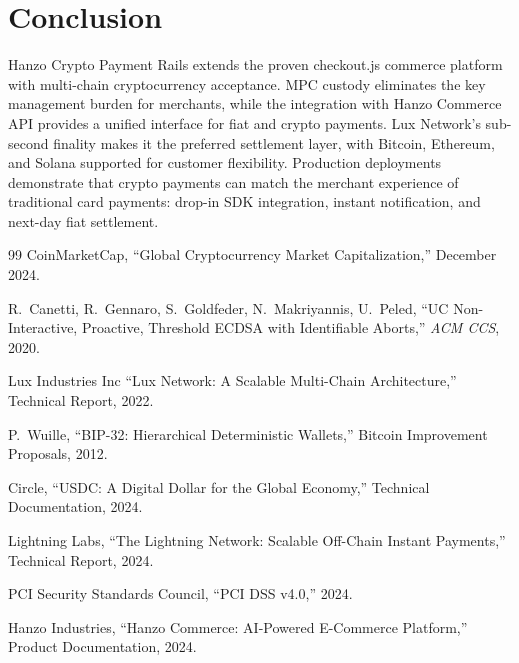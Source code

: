 \section{Conclusion}

\label{sec:conclusion}

Hanzo Crypto Payment Rails extends the proven checkout.js commerce
platform with multi-chain cryptocurrency acceptance. MPC custody
eliminates the key management burden for merchants, while the
integration with Hanzo Commerce API provides a unified interface for
fiat and crypto payments. Lux Network's sub-second finality makes it
the preferred settlement layer, with Bitcoin, Ethereum, and Solana
supported for customer flexibility. Production deployments demonstrate
that crypto payments can match the merchant experience of traditional
card payments: drop-in SDK integration, instant notification, and
next-day fiat settlement.

\begin{thebibliography}{99}
CoinMarketCap, ``Global Cryptocurrency Market Capitalization,''
December 2024.

R.~Canetti, R.~Gennaro, S.~Goldfeder, N.~Makriyannis, U.~Peled,
``UC Non-Interactive, Proactive, Threshold ECDSA with Identifiable
Aborts,'' \textit{ACM CCS}, 2020.

Lux Industries Inc ``Lux Network: A Scalable Multi-Chain Architecture,''
Technical Report, 2022.

P.~Wuille, ``BIP-32: Hierarchical Deterministic Wallets,''
Bitcoin Improvement Proposals, 2012.

Circle, ``USDC: A Digital Dollar for the Global Economy,''
Technical Documentation, 2024.

Lightning Labs, ``The Lightning Network: Scalable Off-Chain Instant
Payments,'' Technical Report, 2024.

PCI Security Standards Council, ``PCI DSS v4.0,'' 2024.

Hanzo Industries, ``Hanzo Commerce: AI-Powered E-Commerce Platform,''
Product Documentation, 2024.
\end{thebibliography}

